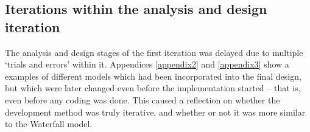 \subsection{Iterations within the analysis and design iteration}
The analysis and design stages of the first iteration was delayed due to
multiple `trials and errors' within it. Appendices \ref{appendix2} and
\ref{appendix3} show a examples of different models which had been incorporated
into the final design, but which were later changed even before the
implementation started -- that is, even before any coding was done. This caused
a reflection on whether the development method was truly iterative, and whether
or not it was more similar to the Waterfall model.
